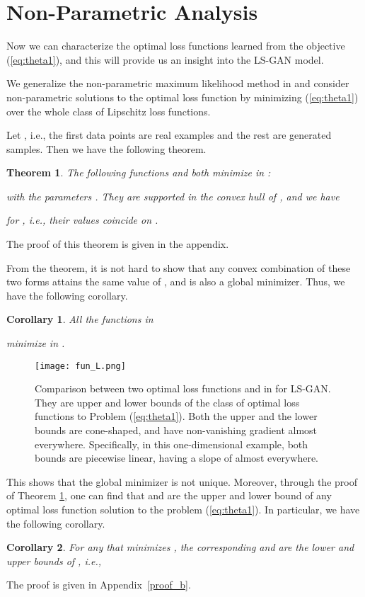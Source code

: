 \documentclass[11pt,fullpage, letterpaper,twoside]{article}
\newtheorem{theorem}{Theorem}
\newtheorem{corollary}{Corollary}
\newcommand{\1}[1]{\mathds{1}_{\left[#1\right]}}
\begin{document}
\section{Non-Parametric Analysis}\label{sec:nonparam}
Now we can characterize the optimal loss functions learned from the objective (\ref{eq:theta1}), and this will provide us an insight into the LS-GAN model.

We generalize the non-parametric maximum likelihood method in \cite{carando2009nonparametric} and consider non-parametric solutions to the optimal loss function by minimizing (\ref{eq:theta1}) over the whole class of Lipschitz loss functions.




Let , i.e., the first  data points are real examples and the rest  are generated samples.  Then we have the following theorem.
\begin{theorem}\label{thm_nonparam}
The following functions  and  both minimize  in :

with the parameters . They are supported in the convex hull of , and we have

for , i.e., their values coincide on .
\end{theorem}
The proof of this theorem is given in the appendix.


From the theorem, it is not hard to show that any convex combination of these two forms attains the same value of , and is also a global minimizer.  Thus, we have the following corollary.

\begin{corollary}
All the functions in

 minimize  in .
\end{corollary}

\begin{figure}[t!]
    \centering
        \texttt{[image: fun\_L.png]}
        \caption{Comparison between two optimal loss functions  and  in  for LS-GAN. They are upper and lower bounds of the class of optimal loss functions  to Problem (\ref{eq:theta1}). Both the upper and the lower bounds are cone-shaped, and have non-vanishing gradient almost everywhere. Specifically,
        in this one-dimensional example, both bounds are piecewise linear, having a slope of  almost everywhere.}\label{fig:fun_L}
\end{figure}

This shows that the global minimizer is not unique. Moreover, through the proof of Theorem \ref{thm_nonparam}, one can find that  and  are the upper and lower bound of any optimal loss function solution to the problem (\ref{eq:theta1}). In particular, we have the following corollary.
\begin{corollary}\label{cor2}
For any  that minimizes , the corresponding  and  are the lower and upper bounds of , i.e.,

\end{corollary}
The proof is given in Appendix~\ref{proof_b}.
\end{document}

